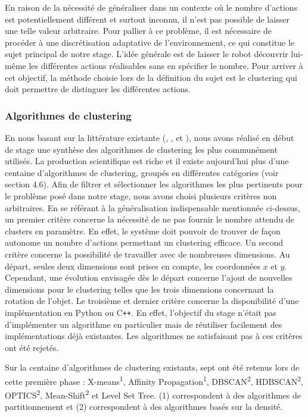 \documentclass{llncs}
\begin{document}
En raison de la nécessité de généraliser dans un contexte où le nombre d'actions est potentiellement différent et surtout inconnu, il n'est pas possible de laisser une telle valeur arbitraire.
Pour pallier à ce problème, il est nécessaire de procéder à une discrétisation adaptative de l'environnement, ce qui constitue le sujet principal de notre stage.
L'idée générale est de laisser le robot découvrir lui-même les différentes actions réalisables sans en spécifier le nombre.
Pour arriver à cet objectif, la méthode choisie lors de la définition du sujet est le clustering qui doit permettre de distinguer les différentes actions.




\subsubsection{Algorithmes de clustering}

En nous basant sur la littérature existante (\cite{Xu2015}, \cite{Andreopoulos2009}, \cite{Fahad2014} et \cite{Sajana2016}), nous avons réalisé en début de stage une synthèse des algorithmes de clustering les plus communément utilisés.
La production scientifique est riche et il existe aujourd'hui plus d'une centaine d'algorithmes de clustering, groupés en différentes catégories (voir section 4.6).
Afin de filtrer et sélectionner les algorithmes les plus pertinents pour le problème posé dans notre stage, nous avons choisi plusieurs critères non arbitraires.
En se référant à la généralisation indispensable mentionnée ci-dessus, un premier critère concerne la nécessité de ne pas fournir le nombre attendu de clusters en paramètre.
En effet, le système doit pouvoir de trouver de façon autonome un nombre d'actions permettant un clustering efficace.
Un second critère concerne la possibilité de travailler avec de nombreuses dimensions.
Au départ, seules deux dimensions sont prises en compte, les coordonnées $x$ et $y$.
Cependant, une évolution envisagée dès le départ concerne l'ajout de nouvelles dimensions pour le clustering telles que les trois dimensions concernant la rotation de l'objet.
Le troisième et dernier critère concerne la disponibilité d'une implémentation en Python ou C{}\verb!++!.
En effet, l'objectif du stage n'était pas d'implémenter un algorithme en particulier mais de réutiliser facilement des implémentations déjà existantes.
Les algorithmes ne satisfaisant pas à ces critères ont été rejetés.

Sur la centaine d'algorithmes de clustering existants, sept ont été retenus lors de cette première phase : X-means\textsuperscript{1}, Affinity Propagation\textsuperscript{1}, DBSCAN\textsuperscript{2}, HDBSCAN\textsuperscript{2}, OPTICS\textsuperscript{2}, Mean-Shift\textsuperscript{2} et Level Set Tree. (1) correspondent à des algorithmes de partitionnement et (2) correspondent à des algorithmes basés sur la densité.
\end{document}
